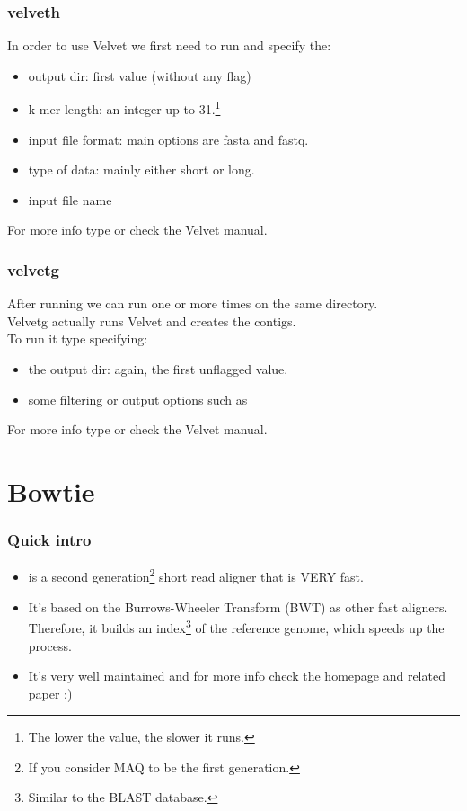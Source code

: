 \begin{frame}[allowframebreaks]
  \frametitle{velveth}
  In order to use Velvet we first need to run  and specify the:
  \begin{itemize}
  \item output dir: first value (without any flag)
  \item k-mer length: an integer up to 31.\footnote{The lower the value, the slower it runs.}
  \item input file format: main options are fasta and fastq.
  \item type of data: mainly either short or long.
  \item input file name
  \end{itemize}
  For more info type  or check the Velvet manual.
\end{frame}

\begin{frame}[allowframebreaks]
  \frametitle{velvetg}
  After running  we can run  one or more times on the same directory. \\ Velvetg actually runs Velvet and creates the contigs. \\ To run it type  specifying:
  \begin{itemize}
  \item the output dir: again, the first unflagged value.
  \item some filtering or output options such as 
  \end{itemize}
  For more info type  or check the Velvet manual.
\end{frame}

\section{Bowtie}
\begin{frame}[allowframebreaks]
  \frametitle{Quick intro}
  \begin{itemize}
  \item {} is a second generation\footnote{If you consider MAQ to be the first generation.} short read aligner that is \alert{VERY} fast.
  \item It's based on the Burrows-Wheeler Transform (BWT) as other fast aligners. Therefore, it builds an index\footnote{Similar to the BLAST database.} of the reference genome, which speeds up the process.
  \item It's very well maintained and for more info check the homepage and related paper :)
  \end{itemize}
\end{frame}

